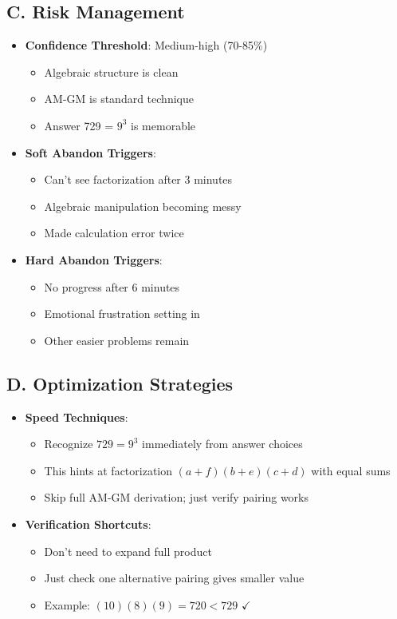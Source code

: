 \documentclass[]{article}
\begin{document}
\begin{competitionbox}
\subsection*{C. Risk Management}
\begin{itemize}[leftmargin=*]
    \item \textbf{Confidence Threshold}: Medium-high (70-85\%)
    \begin{itemize}
        \item Algebraic structure is clean
        \item AM-GM is standard technique
        \item Answer 729 = $9^3$ is memorable
    \end{itemize}
    \item \textbf{Soft Abandon Triggers}:
    \begin{itemize}
        \item Can't see factorization after 3 minutes
        \item Algebraic manipulation becoming messy
        \item Made calculation error twice
    \end{itemize}
    \item \textbf{Hard Abandon Triggers}:
    \begin{itemize}
        \item No progress after 6 minutes
        \item Emotional frustration setting in
        \item Other easier problems remain
    \end{itemize}
\end{itemize}

\subsection*{D. Optimization Strategies}
\begin{itemize}[leftmargin=*]
    \item \textbf{Speed Techniques}:
    \begin{itemize}
        \item Recognize $729 = 9^3$ immediately from answer choices
        \item This hints at factorization $(a+f)(b+e)(c+d)$ with equal sums
        \item Skip full AM-GM derivation; just verify pairing works
    \end{itemize}
    \item \textbf{Verification Shortcuts}:
    \begin{itemize}
        \item Don't need to expand full product
        \item Just check one alternative pairing gives smaller value
        \item Example: $(10)(8)(9) = 720 < 729$ $\checkmark$
    \end{itemize}
\end{itemize}
\end{competitionbox}
\end{document}
